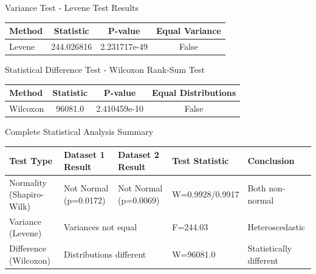 \documentclass[10pt]{beamer}
\begin{document}
{   \begin{frame}{Variance Test - Levene Test Results}
   \centering
   \begin{tabular}{l S[table-format=3.6] S[table-format=1.6e1] c}
   \toprule
   \textbf{Method} & \textbf{Statistic} & \textbf{P-value} & \textbf{Equal Variance} \\
   \midrule
   Levene & 244.026816 & 2.231717e-49 & False \\
   \bottomrule
   \end{tabular}
   \end{frame}

   \begin{frame}{Statistical Difference Test - Wilcoxon Rank-Sum Test}
   \centering
   \begin{tabular}{l S[table-format=5.1] S[table-format=1.6e1] c}
   \toprule
   \textbf{Method} & \textbf{Statistic} & \textbf{P-value} & \textbf{Equal Distributions} \\
   \midrule
   Wilcoxon & 96081.0 & 2.410459e-10 & False \\
   \bottomrule
   \end{tabular}
   \end{frame}

   \begin{frame}{Complete Statistical Analysis Summary}
   \centering
   \scriptsize
   \begin{tabular}{l l l l l}
   \toprule
   \textbf{Test Type} & \textbf{Dataset 1 Result} & \textbf{Dataset 2 Result} & \textbf{Test Statistic} & \textbf{Conclusion} \\
   \midrule
   Normality (Shapiro-Wilk) & Not Normal (p=0.0172) & Not Normal (p=0.0069) & W=0.9928/0.9917 & Both non-normal \\
   Variance (Levene) & \multicolumn{2}{l}{Variances not equal} & F=244.03 & Heteroscedastic \\
   Difference (Wilcoxon) & \multicolumn{2}{l}{Distributions different} & W=96081.0 & Statistically different \\
   \bottomrule
   \end{tabular}
   

\end{frame}}
\end{document}
